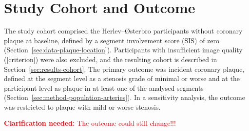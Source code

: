 \providecommand{\clarify}[1]{\textcolor{red}{\textbf{Clarification needed:} #1}}
\section{Study Cohort and Outcome}
\label{sec:method-population}

The study cohort comprised the Herlev--{\O}sterbro participants without coronary plaque at baseline, defined by a segment involvement score (SIS) of zero (Section~\ref{sec:data-plaque-location}).
Participants with insufficient image quality ([criterion]) were also excluded, and the resulting cohort is described in Section~\ref{sec:results-cohort}.
The primary outcome was incident coronary plaque, defined at the segment level as a stenosis grade of minimal or worse and at the participant level as plaque in at least one of the analysed segments (Section~\ref{sec:method-population-arteries}).
In a sensitivity analysis, the outcome was restricted to plaque with mild or worse stenosis.

\clarify{The outcome could still change!!!}
